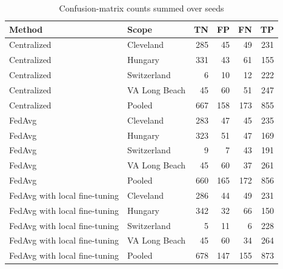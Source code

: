 \begin{table}[ht]
\centering
\small
\caption{Confusion-matrix counts summed over seeds}
\label{tab:table7_confusion_totals}
\begin{tabular}{llrrrr}
\toprule
Method & Scope & TN & FP & FN & TP \\
\midrule
Centralized & Cleveland & 285 & 45 & 49 & 231 \\
Centralized & Hungary & 331 & 43 & 61 & 155 \\
Centralized & Switzerland & 6 & 10 & 12 & 222 \\
Centralized & VA Long Beach & 45 & 60 & 51 & 247 \\
Centralized & Pooled & 667 & 158 & 173 & 855 \\
FedAvg & Cleveland & 283 & 47 & 45 & 235 \\
FedAvg & Hungary & 323 & 51 & 47 & 169 \\
FedAvg & Switzerland & 9 & 7 & 43 & 191 \\
FedAvg & VA Long Beach & 45 & 60 & 37 & 261 \\
FedAvg & Pooled & 660 & 165 & 172 & 856 \\
FedAvg with local fine-tuning & Cleveland & 286 & 44 & 49 & 231 \\
FedAvg with local fine-tuning & Hungary & 342 & 32 & 66 & 150 \\
FedAvg with local fine-tuning & Switzerland & 5 & 11 & 6 & 228 \\
FedAvg with local fine-tuning & VA Long Beach & 45 & 60 & 34 & 264 \\
FedAvg with local fine-tuning & Pooled & 678 & 147 & 155 & 873 \\
\bottomrule
\end{tabular}
\end{table}
